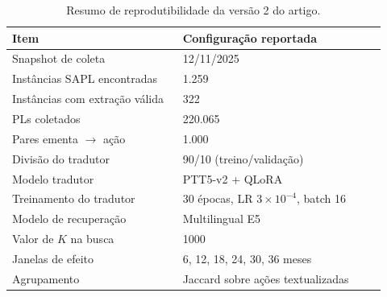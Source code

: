 \begin{table}[H]
\centering
\caption{Resumo de reprodutibilidade da versão 2 do artigo.}
\label{tab:reprodutibilidade}
\small
\begin{tabular}{p{0.42\linewidth} p{0.5\linewidth}}
\toprule
Item & Configuração reportada \\
\midrule
Snapshot de coleta & 12/11/2025 \\
Instâncias SAPL encontradas & 1.259 \\
Instâncias com extração válida & 322 \\
PLs coletados & 220.065 \\
Pares ementa $\rightarrow$ ação & 1.000 \\
Divisão do tradutor & 90/10 (treino/validação) \\
Modelo tradutor & PTT5-v2 + QLoRA \\
Treinamento do tradutor & 30 épocas, LR $3\times10^{-4}$, batch 16 \\
Modelo de recuperação & Multilingual E5 \\
Valor de $K$ na busca & 1000 \\
Janelas de efeito & 6, 12, 18, 24, 30, 36 meses \\
Agrupamento & Jaccard sobre ações textualizadas \\
\bottomrule
\end{tabular}
\end{table}
